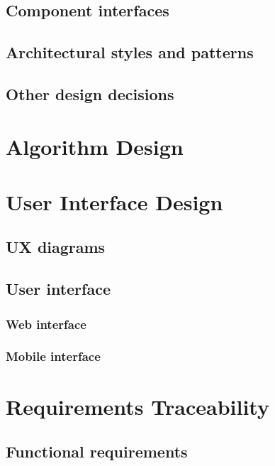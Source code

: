 \documentclass{article}
\begin{document}
	\subsection{Component interfaces}
	
	
	\subsection{Architectural styles and patterns}


	\subsection{Other design decisions}


	\section{Algorithm Design}


	\section{User Interface Design}


	\subsection{UX diagrams}


	\subsection{User interface}


	\subsubsection{Web interface}


	\subsubsection{Mobile interface}


	\section{Requirements Traceability}


	\subsection{Functional requirements}
\end{document}
